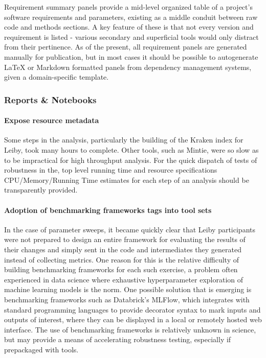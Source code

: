 \documentclass{drexelthesis}
\begin{document}
Requirement summary panels provide a mid-level organized table of a project's software requirements and parameters, existing as a middle conduit between raw code and methods sections. A key feature of these is that not every version and requirement is listed - various secondary and superficial tools would only distract from their pertinence. As of the present, all requirement panels are generated manually for publication, but in most cases it should be possible to autogenerate LaTeX or Markdown formatted panels from dependency management systems, given a domain-specific template.

\subsubsection{Reports \& Notebooks}

\paragraph{Expose resource metadata}

Some steps in the analysis, particularly the building of the Kraken index for Leiby, took many hours to complete. Other tools, such as Mintie, were so slow as to be impractical for high throughput analysis. For the quick dispatch of tests of robustness in the, top level running time and resource specifications CPU/Memory/Running Time estimates for each step of an analysis should be transparently provided.

\paragraph{Adoption of benchmarking frameworks tags into tool sets}

In the case of parameter sweeps, it became quickly clear that Leiby participants were not prepared to design an entire framework for evaluating the results of their changes and simply sent in the code and intermediates they generated instead of collecting metrics. One reason for this is the relative difficulty of building benchmarking frameworks for each such exercise, a problem often experienced in data science where exhaustive hyperparameter exploration of machine learning models is the norm. One possible solution that is emerging is benchmarking frameworks such as Databrick's MLFlow, which integrates with standard programming languages to provide decorator syntax to mark inputs and outputs of interest, where they can be displayed in a local or remotely hosted web interface. The use of benchmarking frameworks is relatively unknown in science, but may provide a means of accelerating robustness testing, especially if prepackaged with tools.
\end{document}
